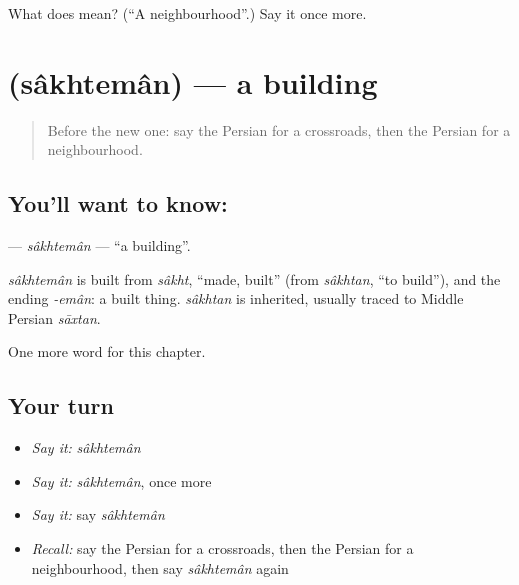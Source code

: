 \begin{tcolorbox}[breakable,colback=teal!4,colframe=teal!35!black,title={Before you move on}]
What does  mean? (\textquotedblleft{}A neighbourhood\textquotedblright{}.) Say it once more.
\end{tcolorbox}
\section[\texorpdfstring{\fa{ساختمان} (sâkhtemân)}{ساختمان (sâkhtemân)}]{ (sâkhtemân) — a building}

\label{lesson:FA-C266-sakhteman}



\begin{quote}
Before the new one: say the Persian for a crossroads, then the Persian for a neighbourhood.
\end{quote}

\subsection*{You'll want to know: }
\textbf{} — \emph{sâkhtemân} — \textquotedblleft{}a building\textquotedblright{}.

\begin{cousinweb}
\emph{sâkhtemân} is built from \emph{sâkht}, \textquotedblleft{}made, built\textquotedblright{} (from \emph{sâkhtan}, \textquotedblleft{}to build\textquotedblright{}), and the ending \emph{-emân}: a built thing. \emph{sâkhtan} is inherited, usually traced to Middle Persian \emph{sāxtan}.
\end{cousinweb}

\begin{grammarlens}[title={What you've built}]
One more word for this chapter.
\end{grammarlens}

\subsection*{Your turn}
\begin{itemize}
\raggedright
  \item \emph{Say it:} \emph{sâkhtemân}
  \item \emph{Say it:} \emph{sâkhtemân}, once more
  \item \emph{Say it:} say \emph{sâkhtemân}
  \item \emph{Recall:} say the Persian for a crossroads, then the Persian for a neighbourhood, then say \emph{sâkhtemân} again
\end{itemize}

